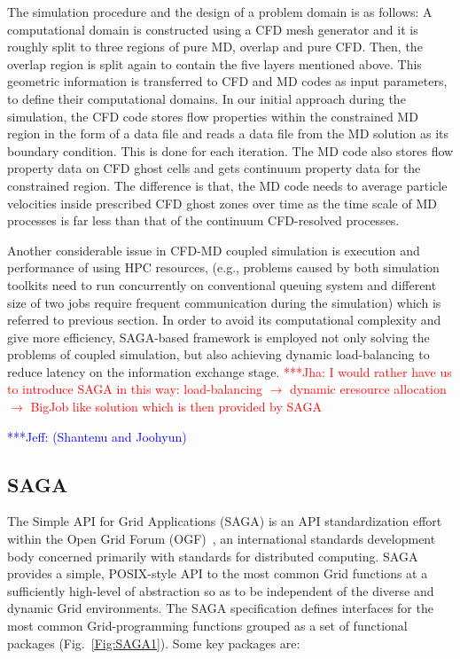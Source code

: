 \documentclass[conference,final]{IEEEtran}
\newcommand{\jhanote}[1]{ {\textcolor{red} { ***Jha: #1 }}}
\newcommand{\Nkimnote}[1]{ {\textcolor{green} { ***Nkim: #1 }}}
\newcommand{\skonote}[1]{ {\textcolor{blue} { ***Jeff: #1 }}}
\newcommand{\jhanote}[1]{}
\newcommand{\Nkimnote}[1]{}
\newcommand{\skonote}[1]{}
\begin{document}
The simulation procedure and the design of a problem domain is as follows: A computational domain is constructed using a CFD mesh generator and it is roughly split to three regions of pure MD, overlap and pure CFD. Then, the overlap region is split again to contain the five layers mentioned above. This geometric information is transferred to CFD and MD codes as input parameters, to define their computational domains. In our initial approach during the simulation, the CFD code stores flow properties within the constrained MD region in the form of a data file and reads a data file from the MD solution as its boundary condition. This is done for each iteration. The MD code also stores flow property data on CFD ghost cells and gets continuum property data for the constrained region. The difference is that, the MD code needs to average particle velocities inside prescribed CFD ghost zones over time as the time scale of MD processes is far less than that of the continuum CFD-resolved processes. 

Another considerable issue in CFD-MD coupled simulation is execution and performance of using HPC resources, (e.g., problems caused by both simulation toolkits need to run concurrently on conventional queuing system and different size of two jobs require frequent communication during the simulation) which is referred to previous section. In order to avoid its computational complexity and give more efficiency, SAGA-based framework is employed not only solving the problems of coupled simulation, but also achieving dynamic load-balancing to reduce latency on the information exchange stage. 
\jhanote{I would rather have us to introduce SAGA in this way: load-balancing $\rightarrow$ dynamic eresource allocation $\rightarrow$ BigJob like solution which is then provided by SAGA} 

\skonote{(Shantenu and Joohyun)}

\subsection{SAGA}

The Simple API for Grid Applications (SAGA) is an API standardization effort within the Open Grid Forum (OGF)~\cite{ogf_web}, an international standards development body concerned primarily with standards for distributed computing.  SAGA provides a simple, POSIX-style API to the most common Grid functions at a sufficiently high-level of abstraction so as to be %
independent of the diverse and dynamic Grid environments. The SAGA specification defines interfaces for the most common Grid-programming functions grouped as a set of functional packages (Fig.~\ref{Fig:SAGA1}).  Some key packages are:
\end{document}
